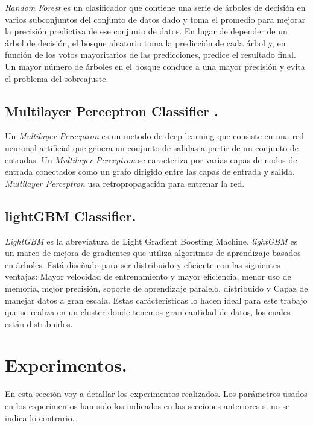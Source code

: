 \documentclass[11pt]{article}
\begin{document}
\textit{Random Forest} es un clasificador que contiene una serie de árboles de decisión en varios subconjuntos del conjunto de datos dado y toma el promedio para mejorar la precisión predictiva de ese conjunto de datos. En lugar de depender de un árbol de decisión, el bosque aleatorio toma la predicción de cada árbol y, en función de los votos mayoritarios de las predicciones, predice el resultado final. Un mayor número de árboles en el bosque conduce a una mayor precisión y evita el problema del sobreajuste.


\subsection{Multilayer Perceptron Classifier .}

Un \textit{Multilayer Perceptron} es un metodo de deep learning que consiste en una red neuronal artificial que genera un conjunto de salidas a partir de un conjunto de entradas. Un \textit{Multilayer Perceptron} se caracteriza por varias capas de nodos de entrada conectados como un grafo dirigido entre las capas de entrada y salida. \textit{Multilayer Perceptron} usa retropropagación para entrenar la red.



\subsection{lightGBM Classifier.}

\textit{LightGBM} es la abreviatura de Light Gradient Boosting Machine. \textit{lightGBM} es un marco de mejora de gradientes que utiliza algoritmos de aprendizaje basados en árboles. Está diseñado para ser distribuido y eficiente con las siguientes ventajas: Mayor velocidad de entrenamiento y mayor eficiencia, menor uso de memoria, mejor precisión, soporte de aprendizaje paralelo, distribuido y Capaz de manejar datos a gran escala. Estas carácterísticas lo hacen ideal para este trabajo que se realiza en un cluster donde tenemos gran cantidad de datos, los cuales están distribuidos. 

\section{Experimentos.}

En esta sección voy a detallar los experimentos realizados. Los parámetros usados en los experimentos han sido los indicados en las secciones anteriores si no se indica lo contrario.
\end{document}
